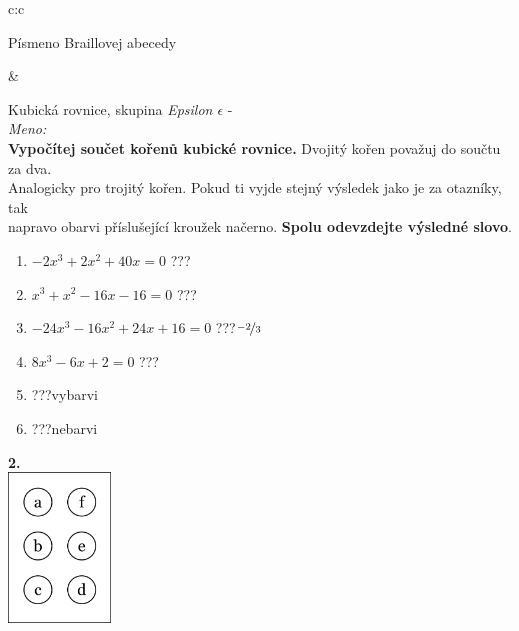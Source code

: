 \documentclass[10pt]{report}
\begin{document}
\begin{tabular}{c:c}
\begin{minipage}[c][99mm][t]{0.49\linewidth}
\begin{center}
\begin{minipage}{0.20\linewidth}
\begin{center}
{\small Písmeno Braillovej abecedy}
\end{center}
\end{minipage}
\end{center}
\end{minipage}
&
\begin{minipage}[c][99mm][t]{0.49\linewidth}
\begin{center}
\vspace{7mm}
{\huge Kubická rovnice, skupina \textit{Epsilon $\epsilon$} -}\\[4.5mm]
\textit{Meno:}\phantom{xxxxxxxxxxxxxxxxxxxxxxxxxxxxxxxxxxxxxxxxxxxxxxxxxxxxxxxxxxxxxxxxx}\\[3.5mm]
\textbf{Vypočítej součet kořenů kubické rovnice.} Dvojitý kořen považuj do součtu za dva.\\Analogicky pro trojitý kořen. Pokud ti vyjde stejný výsledek jako je za otazníky, tak\\napravo obarvi příslušející kroužek načerno. \textbf{Spolu odevzdejte výsledné slovo}.\\[3mm]
\begin{minipage}{0.77\linewidth}
\begin{center}
\begin{varwidth}{\textwidth}
\begin{enumerate}
\large
\item $-2x^3+2x^2+40x=0$\quad \dotfill\; ???\;\dotfill {}
\item $x^3+x^2-16x-16=0$\quad \dotfill\; ???\;\dotfill {}
\item $-24x^3-16x^2+24x+16=0$\quad \dotfill\; ???\;\dotfill \quad $\nicefrac{-2}{3}$
\item $8x^3-6x+2=0$\quad \dotfill\; ???\;\dotfill {}
\item \quad \dotfill\; ???\;\dotfill \quad vybarvi
\item \quad \dotfill\; ???\;\dotfill \quad nebarvi
\end{enumerate}
\end{varwidth}
\end{center}
\end{minipage}
\begin{minipage}{0.20\linewidth}
\begin{center}
{\Huge\bfseries 2.} \\[2mm]
\includegraphics[height=40mm]{../images/braille.png}

\end{center}
\end{minipage}
\end{center}
\end{minipage}
\end{tabular}
\end{document}

